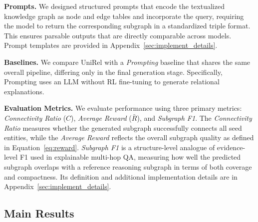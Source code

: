 \textbf{Prompts.} 
We designed structured prompts that encode the textualized knowledge graph as node and edge tables and incorporate the query, requiring the model to return the corresponding subgraph in a standardized triple format.
This ensures parsable outputs that are directly comparable across models.
Prompt templates are provided in Appendix~\ref{sec:implement_details}.

\textbf{Baselines.} We compare UniRel with a \textit{Prompting} baseline that shares the same overall pipeline, differing only in the final generation stage.
Specifically, Prompting uses an LLM without RL fine-tuning to generate relational explanations.

\textbf{Evaluation Metrics.} 
We evaluate performance using three primary metrics: \emph{Connectivity Ratio} ($C$), \emph{Average Reward} ($\bar{R}$), and \emph{Subgraph F1}.
The \emph{Connectivity Ratio} measures whether the generated subgraph successfully connects all seed entities, while the \emph{Average Reward} reflects the overall subgraph quality as defined in Equation~\ref{eq:reward}.
\emph{Subgraph F1} is a structure-level analogue of evidence-level F1 used in explainable multi-hop QA, measuring how well the predicted subgraph overlaps with a reference reasoning subgraph in terms of both coverage and compactness. Its definition and
additional implementation details are in Appendix~\ref{sec:implement_details}.

\subsection{Main Results} 

